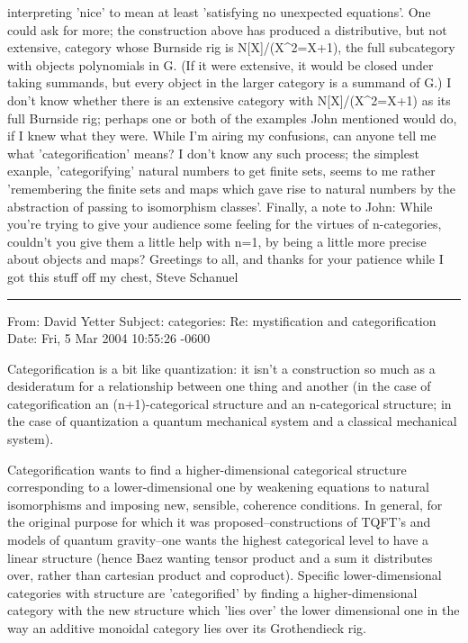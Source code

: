 interpreting  'nice' to mean at least 'satisfying no unexpected
equations'. One could ask for more; the construction above has produced
a distributive, but not extensive, category whose Burnside rig is
N[X]/(X^2=X+1), the full subcategory with objects polynomials in G.
(If it were extensive, it would be closed under taking summands, but
every object in the larger category is a summand of G.) I don't know
whether there is an extensive category with N[X]/(X^2=X+1) as its full
Burnside rig; perhaps one or both of the examples John mentioned would
do, if I knew what they were.
    While I'm airing my confusions, can anyone tell me what
'categorification' means? I don't know any such process; the simplest
exanple, 'categorifying' natural numbers to get finite sets, seems to me
rather 'remembering the finite sets and maps which gave rise to natural
numbers by the abstraction of passing to isomorphism classes'.
   Finally, a note to John: While you're trying to give your audience
some feeling for the virtues of n-categories, couldn't you give them a
little help with n=1, by being a little more precise about objects and
maps?
   Greetings to all, and thanks for your patience while I got this stuff
off my chest,
   Steve Schanuel


\par\noindent\rule{\textwidth}{0.4pt}


From: 	 David Yetter 
Subject: categories: Re: mystification and categorification
Date: 	 Fri, 5 Mar 2004 10:55:26 -0600	

Categorification is a bit like quantization:  it isn't a construction so much
as a desideratum for a relationship between one thing and another (in the
case of categorification an (n+1)-categorical structure and an n-categorical
structure; in the case of quantization a quantum mechanical system and
a classical mechanical system).

Categorification wants to find a higher-dimensional categorical structure
corresponding to a lower-dimensional one by weakening equations to
natural isomorphisms and imposing new, sensible, coherence conditions.
In general, for the original purpose for which it was proposed--constructions
of TQFT's and models of quantum gravity--one wants the highest categorical
level to have a linear structure (hence Baez wanting tensor product
and a sum it distributes over, rather than cartesian product and coproduct).
Specific lower-dimensional categories with structure are 'categorified' by
finding a higher-dimensional category with the new structure which 'lies over'
the lower dimensional one in the way an additive monoidal category lies
over its Grothendieck rig.

